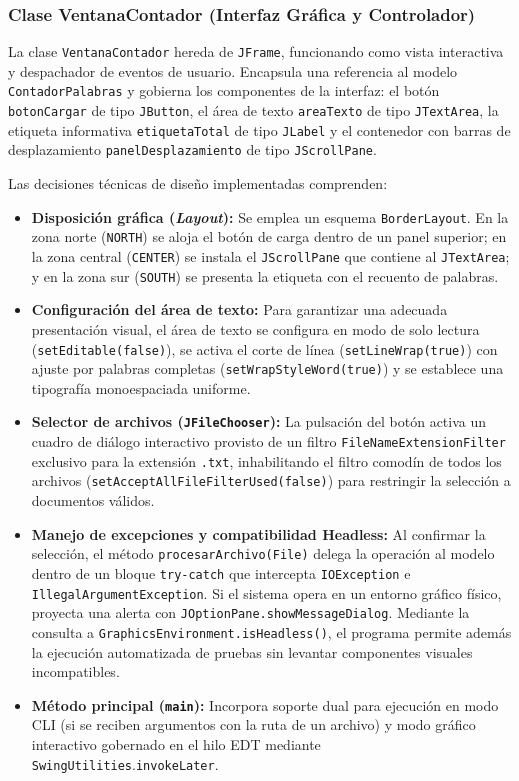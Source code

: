 \documentclass[letterpaper,12pt,oneside]{article}
\numberwithin{figure}{section}
\begin{document}
\subsubsection{Clase VentanaContador (Interfaz Gráfica y Controlador)}
La clase \texttt{VentanaContador} hereda de \texttt{JFrame}, funcionando como vista interactiva y despachador de eventos de usuario. Encapsula una referencia al modelo \texttt{ContadorPalabras} y gobierna los componentes de la interfaz: el botón \texttt{botonCargar} de tipo \texttt{JButton}, el área de texto \texttt{areaTexto} de tipo \texttt{JTextArea}, la etiqueta informativa \texttt{etiquetaTotal} de tipo \texttt{JLabel} y el contenedor con barras de desplazamiento \texttt{panelDesplazamiento} de tipo \texttt{JScrollPane}.

Las decisiones técnicas de diseño implementadas comprenden:
\begin{itemize}
  \item \textbf{Disposición gráfica (\textit{Layout}):} Se emplea un esquema \texttt{BorderLayout}. En la zona norte (\texttt{NORTH}) se aloja el botón de carga dentro de un panel superior; en la zona central (\texttt{CENTER}) se instala el \texttt{JScrollPane} que contiene al \texttt{JTextArea}; y en la zona sur (\texttt{SOUTH}) se presenta la etiqueta con el recuento de palabras.
  \item \textbf{Configuración del área de texto:} Para garantizar una adecuada presentación visual, el área de texto se configura en modo de solo lectura (\texttt{set\-Editable(false)}), se activa el corte de línea (\texttt{set\-Line\-Wrap(true)}) con ajuste por palabras completas (\texttt{set\-Wrap\-Style\-Word(true)}) y se establece una tipografía monoespaciada uniforme.
  \item \textbf{Selector de archivos (\texttt{JFileChooser}):} La pulsación del botón activa un cuadro de diálogo interactivo provisto de un filtro \texttt{FileNameExtensionFilter} exclusivo para la extensión \texttt{.txt}, inhabilitando el filtro comodín de todos los archivos (\texttt{setAccept\-All\-File\-Filter\-Used(false)}) para restringir la selección a documentos válidos.
  \item \textbf{Manejo de excepciones y compatibilidad Headless:} Al confirmar la selección, el método \texttt{procesarArchivo(File)} delega la operación al modelo dentro de un bloque \texttt{try-catch} que intercepta \texttt{IOException} e \texttt{Illegal\-Argument\-Exception}. Si el sistema opera en un entorno gráfico físico, proyecta una alerta con \texttt{JOptionPane.showMessageDialog}. Mediante la consulta a \texttt{GraphicsEnvironment.isHeadless()}, el programa permite además la ejecución automatizada de pruebas sin levantar componentes visuales incompatibles.
  \item \textbf{Método principal (\texttt{main}):} Incorpora soporte dual para ejecución en modo CLI (si se reciben argumentos con la ruta de un archivo) y modo gráfico interactivo gobernado en el hilo EDT mediante \texttt{SwingUtilities}.\allowbreak\texttt{invokeLater}.
\end{itemize}
\end{document}
